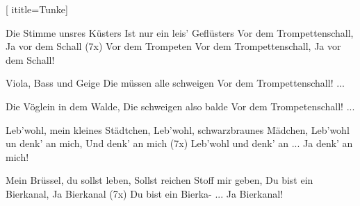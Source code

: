  [
ititle={Tunke}]

\beginverse
Die Stimme unsres Küsters
Ist nur ein leis' Geflüsters
Vor dem Trompettenschall,
Ja vor dem Schall (7x)
Vor dem Trompeten
Vor dem Trompettenschall,
Ja vor dem Schall!
\endverse

\beginverse
Viola, Bass und Geige
Die müssen alle schweigen
Vor dem Trompettenschall! ...
\endverse

\beginverse
Die Vöglein in dem Walde,
Die schweigen also balde
Vor dem Trompetenschall! ...
\endverse

\beginverse
Leb'wohl, mein kleines Städtchen,
Leb'wohl, schwarzbraunes Mädchen,
Leb'wohl un denk' an mich,
Und denk' an mich (7x)
Leb'wohl und denk' an ...
Ja denk' an mich!
\endverse

\beginverse
Mein Brüssel, du sollst leben,
Sollst reichen Stoff mir geben,
Du bist ein Bierkanal,
Ja Bierkanal (7x)
Du bist ein Bierka- ...
Ja Bierkanal!
\endverse
\endsong